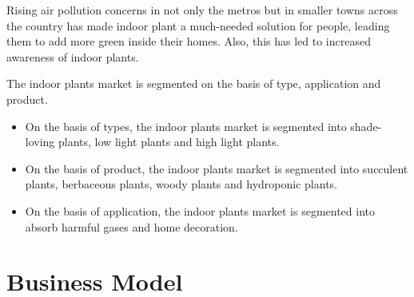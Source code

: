 \documentclass{article}
\begin{document}
\setlength{\parskip}{1em}

Rising air pollution concerns in not only the metros but in smaller towns across the country has made indoor plant a much-needed solution for people, leading them to add more green inside their homes. Also, this has led to increased awareness of indoor plants.

\setlength{\parskip}{1em}

The indoor plants market is segmented on the basis of type, application and product.

\begin{itemize}
    \item On the basis of types, the indoor plants market is segmented into shade- loving plants, low light plants and high light plants.
    \item On the basis of product, the indoor plants market is segmented into succulent plants, berbaceous plants, woody plants and hydroponic plants.
    \item On the basis of application, the indoor plants market is segmented into absorb harmful gases and home decoration.
\end{itemize}

\section{Business Model}
\end{document}
